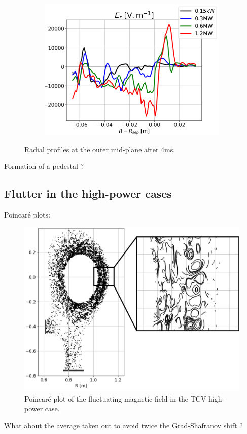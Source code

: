 \begin{figure}[H]
\begin{subfigure}[t]{0.30\textwidth}
		\includegraphics[width=1\textwidth]{schemes/TCVpowerScan_OMP_profiles_global_fields_E_r.png}
	\end{subfigure}
	\caption{Radial profiles at the outer mid-plane after 4ms.}
	\label{fig:TCV_powerScan_OMP_profiles}
\end{figure}


Formation of a pedestal ?




\subsection{Flutter in the high-power cases}

Poincaré plots:


\begin{figure}[H]\centering
	\centering
	\includegraphics[width=1\textwidth]{schemes/poincareFlutterHighPower.png}
	\caption{Poincaré plot of the fluctuating magnetic field in the TCV high-power case.}
	\label{fig:TCV_poincareFlutter}
\end{figure}




What about the average taken out to avoid twice the Grad-Shafranov shift ? 








